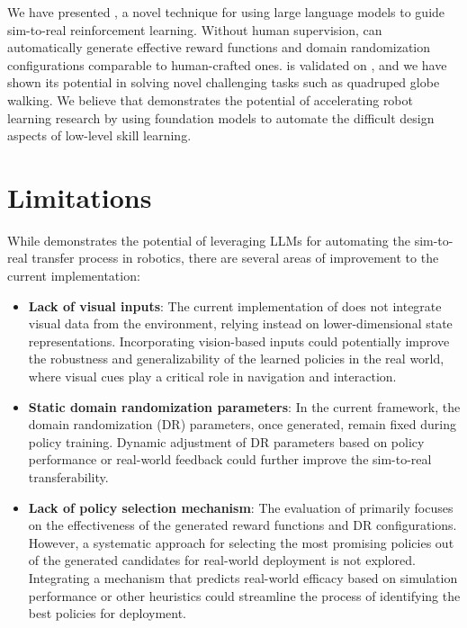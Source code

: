 \documentclass[conference]{IEEEtran}
\begin{document}
We have presented \ourmethod, a novel technique for using large language models to guide sim-to-real reinforcement learning. Without human supervision, \ourmethod can automatically generate effective reward functions and domain randomization configurations comparable to human-crafted ones. \ourmethod is validated on , and we have shown its potential in solving novel challenging tasks such as quadruped globe walking. We believe that \ourmethod demonstrates the potential of accelerating robot learning research by using foundation models to automate the difficult design aspects of low-level skill learning. 

\section{Limitations}
\label{sec:limitations}
While \ourmethod demonstrates the potential of leveraging LLMs for automating the sim-to-real transfer process in robotics, there are several areas of improvement to the current implementation:
\begin{itemize}
  \item \textbf{Lack of visual inputs}: The current implementation of \ourmethod does not integrate visual data from the environment, relying instead on lower-dimensional state representations. Incorporating vision-based inputs could potentially improve the robustness and generalizability of the learned policies in the real world, where visual cues play a critical role in navigation and interaction.

  
  \item \textbf{Static domain randomization parameters}: In the current framework, the domain randomization (DR) parameters, once generated, remain fixed during policy training. Dynamic adjustment of DR parameters based on policy performance or real-world feedback could further improve the sim-to-real transferability.
  \item \textbf{Lack of policy selection mechanism}: The evaluation of \ourmethod primarily focuses on the effectiveness of the generated reward functions and DR configurations. However, a systematic approach for selecting the most promising policies out of the generated candidates for real-world deployment is not explored. Integrating a mechanism that predicts real-world efficacy based on simulation performance or other heuristics could streamline the process of identifying the best policies for deployment.
\end{itemize}
\end{document}
